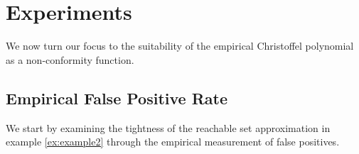 \documentclass[pmlr]{jmlr}%
\begin{document}
\section{Experiments}
\label{sec:Experiments}
We now turn our focus to the suitability of the empirical Christoffel polynomial as a non-conformity function.
%
\subsection{Empirical False Positive Rate}
We start by examining the tightness of the reachable set approximation in example \ref{ex:example2} through the empirical measurement of false positives. 
%
%
\end{document}
